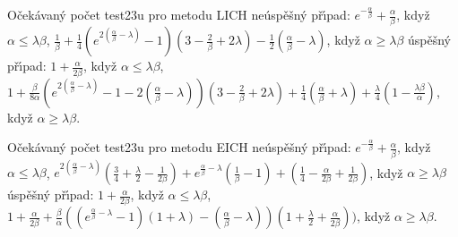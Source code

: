 \documentclass[a4paper,12pt]{article}
\begin{document}
\flushpar O\v cek\'avan\'y po\v cet test\accent23u pro metodu LICH\newline 
ne\'usp\v e\v sn\'y p\v r\'\i pad:\newline 
\phantom{---}$e^{-\frac {\alpha}{\beta}}+\frac {\alpha}{\beta}$, kdy\v z  $
\alpha\le\lambda\beta$, \newline 
\phantom{---}$\frac 1{\beta}+\frac 14(e^{2(\frac {\alpha}{\beta}-
\lambda )}-1)(3-\frac 2{\beta}+2\lambda )-\frac 12(\frac {\alpha}{
\beta}-\lambda )$, kdy\v z $\alpha\ge\lambda\beta$\newline 
\'usp\v e\v sn\'y p\v r\'\i pad:\newline 
\phantom{---}$1+\frac {\alpha}{2\beta}$, kdy\v z $\alpha\le\lambda
\beta$, \newline 
\phantom{---}$1+\frac {\beta}{8\alpha}(e^{2(\frac {\alpha}{\beta}
-\lambda )}-1-2(\frac {\alpha}{\beta}-\lambda ))(3-\frac 2{\beta}
+2\lambda )+\frac 14(\frac {\alpha}{\beta}+\lambda )+\frac {\lambda}
4(1-\frac {\lambda\beta}{\alpha})$, 
kdy\v z $\alpha\ge\lambda\beta$.
\medskip

\flushpar O\v cek\'avan\'y po\v cet test\accent23u pro metodu EICH\newline 
ne\'usp\v e\v sn\'y p\v r\'\i pad:\newline 
\phantom{---}$e^{-\frac {\alpha}{\beta}}+\frac {\alpha}{\beta}$, kdy\v z  $
\alpha\le\lambda\beta$, \newline 
\phantom{---}$e^{2(\frac {\alpha}{\beta}-\lambda )}(\frac 34+\frac {
\lambda}2-\frac 1{2\beta})+e^{\frac {\alpha}{\beta}-\lambda}(\frac 
1{\beta}-1)+(\frac 14-\frac {\alpha}{2\beta}+\frac 1{2\beta})$, kdy\v z $
\alpha\ge\lambda\beta$\newline 
\'usp\v e\v sn\'y p\v r\'\i pad:\newline 
\phantom{---}$1+\frac {\alpha}{2\beta}$, kdy\v z $\alpha\le\lambda
\beta$, \newline 
\phantom{---}$1+\frac {\alpha}{2\beta}+\frac {\beta}{\alpha}((e^{\frac {
\alpha}{\beta}-\lambda}-1)(1+\lambda )-(\frac {\alpha}{\beta}-\lambda 
))(1+\frac {\lambda}2+\frac {\alpha}{2\beta}))$, kdy\v z $\alpha\ge
\lambda\beta$.
\medskip
\end{document}
